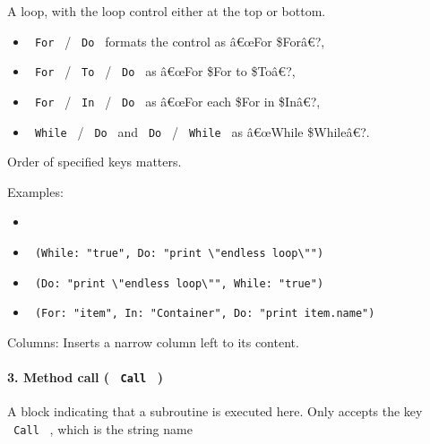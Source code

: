 A loop, with the loop control either at the top or bottom.

\begin{itemize}
\tightlist
\item
  \texttt{\ For\ } / \texttt{\ Do\ } formats the control as â€œFor
  \$Forâ€?,
\item
  \texttt{\ For\ } / \texttt{\ To\ } / \texttt{\ Do\ } as â€œFor \$For
  to \$Toâ€?,
\item
  \texttt{\ For\ } / \texttt{\ In\ } / \texttt{\ Do\ } as â€œFor each
  \$For in \$Inâ€?,
\item
  \texttt{\ While\ } / \texttt{\ Do\ } and \texttt{\ Do\ } /
  \texttt{\ While\ } as â€œWhile \$Whileâ€?.
\end{itemize}

Order of specified keys matters.

Examples:

\begin{itemize}
\tightlist
\item
\item
  \texttt{\ (While:\ "true",\ Do:\ "print\ \textbackslash{}"endless\ loop\textbackslash{}"")\ }

  \pandocbounded{}
\item
  \texttt{\ (Do:\ "print\ \textbackslash{}"endless\ loop\textbackslash{}"",\ While:\ "true")\ }

  \pandocbounded{}
\item
  \texttt{\ (For:\ "item",\ In:\ "Container",\ Do:\ "print\ item.name")\ }

  \pandocbounded{}
\end{itemize}

Columns: Inserts a narrow column left to its content.

\paragraph{\texorpdfstring{3. Method call ( \texttt{\ Call\ }
)}{3. Method call (  Call  )}}\label{method-call-call}

A block indicating that a subroutine is executed here. Only accepts the
key \texttt{\ Call\ } , which is the string name

